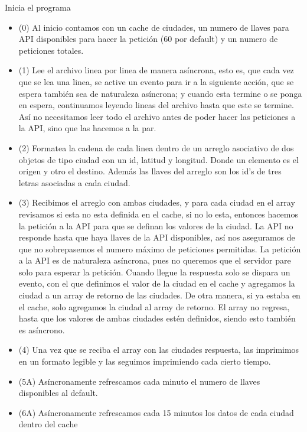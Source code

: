\documentclass{report}
\begin{document}
    Inicia el programa
    \begin{itemize}
        \item (0) Al inicio contamos con un cache de ciudades, un numero de llaves para API disponibles para hacer la petición (60 por default) y un numero de peticiones totales.

        \item (1) Lee el archivo linea por linea de manera asíncrona, esto es, que cada vez que se lea una linea, se active un evento para ir a la siguiente acción, que se espera también sea de naturaleza asíncrona; y cuando esta termine o se ponga en espera, continuamos leyendo lineas del archivo hasta que este se termine. Así no necesitamos leer todo el archivo antes de poder hacer las peticiones a la API, sino que las hacemos a la par.

        \item (2) Formatea la cadena de cada linea dentro de un arreglo asociativo de dos objetos de tipo ciudad con un id, latitud y longitud. Donde un elemento es el origen y otro el destino. Además las llaves del arreglo son los id's de tres letras asociadas a cada ciudad.

        \item (3) Recibimos el arreglo con ambas ciudades, y para cada ciudad en el array revisamos si esta no esta definida en el cache, si no lo esta, entonces hacemos la petición a la API para que se definan los valores de la ciudad. La API no responde hasta que haya llaves de la API disponibles, así nos aseguramos de que no sobrepasemos el numero máximo de peticiones permitidas. La petición a la API es de naturaleza asíncrona, pues no queremos que el servidor pare solo para esperar la petición. Cuando llegue la respuesta solo se dispara un evento, con el que definimos el valor de la ciudad en el cache y agregamos la ciudad a un array de retorno de las ciudades.
        De otra manera, si ya estaba en el cache, solo agregamos la ciudad al array de retorno. El array no regresa, hasta que los valores de ambas ciudades estén definidos, siendo esto también es asíncrono.

        \item (4) Una vez que se reciba el array con las ciudades respuesta, las imprimimos en un formato legible y las seguimos imprimiendo cada cierto tiempo.

        \item (5A) Asíncronamente refrescamos cada minuto el numero de llaves disponibles al default.

        \item (6A) Asíncronamente refrescamos cada 15 minutos los datos de cada ciudad dentro del cache
    \end{itemize}
\end{document}
